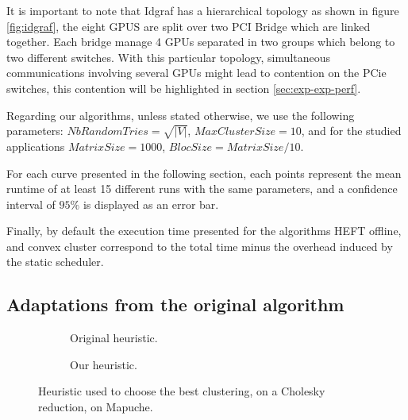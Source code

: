 \documentclass[10pt, conference, compsocconf,pdftex,dvipsnames]{IEEEtran}
\newcommand{\mytodo}[1]{\todo[inline]{#1}}
\begin{document}
It is important to note that Idgraf has a hierarchical topology as shown in
figure \ref{fig:idgraf}, the eight GPUS are split over two PCI Bridge which
are linked together. Each bridge manage 4 GPUs separated in two groups which
belong to two different switches. With this particular topology, simultaneous
communications involving several GPUs might lead to contention on the PCie
switches, this contention will be highlighted in section
\ref{sec:exp-exp-perf}.

Regarding our algorithms, unless stated otherwise, we use the following
parameters: $NbRandomTries=\sqrt{|V|}$, $MaxClusterSize=10$, and for the
studied applications $MatrixSize=1000$, $BlocSize=MatrixSize/10$.

For each curve presented in the following section, each points represent the
mean runtime of at least 15 different runs with the same parameters, and a
confidence interval of $95\%$ is displayed as an error bar.

Finally, by default the execution time presented for the algorithms HEFT
offline, and convex cluster correspond to the total time minus the overhead
induced by the static scheduler.

\subsection{Adaptations from the original algorithm}
\label{sec:exp-adapt}
\mytodo{Re write here and fix figures}
\begin{figure}[htb]
        \centering
        \begin{subfigure}{0.5\textwidth}
            \scalebox{0.6}{
                
            }
            \caption{Original heuristic.}
            \label{fig:RdtMaxDeMin}
        \end{subfigure}
        \begin{subfigure}{0.5\textwidth}
            \scalebox{0.6}{
                
            }
            \caption{Our heuristic.}
            \label{fig:RdtMaxDeMax}
        \end{subfigure}


    \caption{Heuristic used to choose the best clustering, on       
    a Cholesky reduction, on Mapuche.}
    \label{fig:Rdt}
\end{figure}
\end{document}
